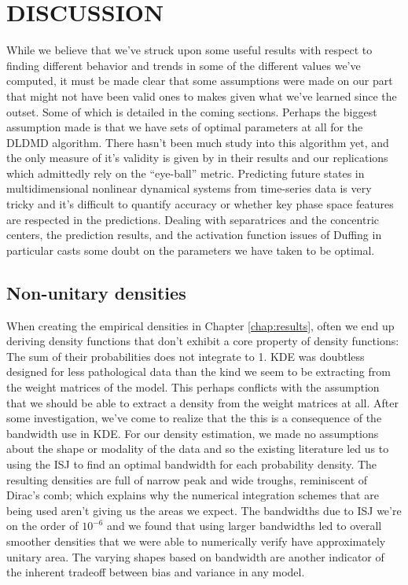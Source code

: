 \chapter{DISCUSSION}
\label{chap:discussion}

While we believe that we've struck upon some useful results with respect to finding different behavior
and trends in some of the different values we've computed, it must be made clear that some assumptions
were made on our part that might not have been valid ones to makes given what we've learned since the 
outset. Some of which is detailed in the coming sections. Perhaps the biggest assumption made is that 
we have sets of optimal parameters at all for the DLDMD algorithm. There hasn't been much study into this 
algorithm yet, and the only measure of it's validity is given by \cite{lago} in their results and our 
replications which admittedly rely on the ``eye-ball'' metric. Predicting future states in multidimensional
nonlinear dynamical systems from time-series data is very tricky and it's difficult to quantify accuracy 
or whether key phase space features are respected in the predictions. Dealing with separatrices and 
the concentric centers, the prediction results, and the activation function issues of Duffing in 
particular casts some doubt on the parameters we have taken to be optimal. 


\section{Non-unitary densities}
When creating the empirical densities in Chapter \ref{chap:results}, often we end up deriving 
density functions that don't exhibit a core property of density functions: The sum of their 
probabilities does not integrate to 1. KDE was doubtless designed for less pathological data than 
the kind we seem to be extracting from the weight matrices of the model. This perhaps conflicts with the 
assumption that we should be able to extract a density from the weight matrices at all. After some 
investigation, we've come to realize that the this is a consequence of the bandwidth use in KDE. 
For our density estimation, we made no assumptions about the shape or modality of the data and so 
the existing literature led us to using the ISJ to find an optimal bandwidth for each probability
density. The resulting densities are full of narrow peak and wide troughs, reminiscent of Dirac's comb;
which explains why the numerical integration schemes that are being used aren't giving us the areas we
expect. The bandwidths due to ISJ we're on the order of $10^{-6}$ and we found that using larger 
bandwidths led to overall smoother densities that we were able to numerically verify have approximately 
unitary area. The varying shapes based on bandwidth are another indicator of the inherent tradeoff 
between bias and variance in any model.

